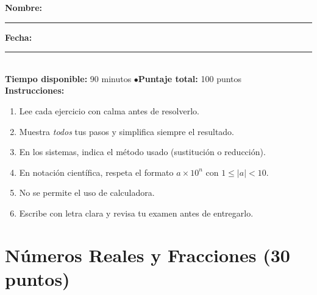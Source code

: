 \documentclass[12pt, letterpaper]{article}
\begin{document}


\vspace{4pt}
\begin{cuadroinfo}
  \small
  \textbf{Nombre:} \rule{0.55\linewidth}{0.4pt} \quad \textbf{Fecha:} \rule{0.15\linewidth}{0.4pt} \\[6pt]
  \textbf{Tiempo disponible:} 90 minutos \quad$\bullet$\quad \textbf{Puntaje total:} 100 puntos \\[4pt]
  \textbf{Instrucciones:}
  \begin{enumerate}[leftmargin=*]
    \item Lee cada ejercicio con calma antes de resolverlo.
    \item Muestra \emph{todos} tus pasos y simplifica siempre el resultado.
    \item En los sistemas, indica el método usado (sustitución o reducción).
    \item En notación científica, respeta el formato $a \times 10^n$ con $1 \leq |a| < 10$.
    \item No se permite el uso de calculadora.
    \item Escribe con letra clara y revisa tu examen antes de entregarlo.
  \end{enumerate}
\end{cuadroinfo}

\vspace{8pt}

\section{Números Reales y Fracciones (30 puntos)}
\end{document}
